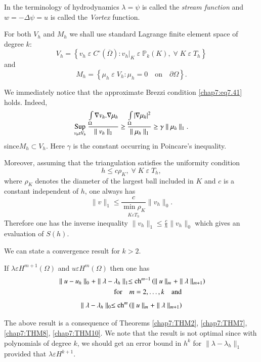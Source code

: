 In the terminology of hydrodynamics $\lambda=\psi$ is called the
\emph{stream function} and $w=-\Delta\psi=u$ is called the
\emph{Vortex} function.

For both $V_h$ and $M_h$ we shall use standard Lagrange finite element
space of degree $k$:
$$
V_h=\left\{v_h\;\varepsilon \;C^\circ(\overline{\Omega}):v_h|_K\;
\varepsilon \;\mathbb{P}_k(K),\;\forall \;K\;\varepsilon \;T_h\right\}
$$
and 
$$
M_h=\left\{\mu_h\;\varepsilon \;V_h:\mu_h=0\quad\text{on}\quad
\partial\Omega\right\}.
$$

We immediately notice that the approximate Brezzi condition
\eqref{chap7:eq7.41} holds. Indeed,
$$
\underset{v_h\varepsilon V_h}{\operatorname{Sup}}\;\frac{\int\limits_\Omega\nabla
v_h.\nabla\mu_h}{\parallel v_h\parallel_1}\geq \frac{\int\limits_\Omega
|\nabla\mu_h|^2}{\parallel\mu_h\parallel_1}\geq\gamma\parallel
\mu_h\parallel_1.
$$
since\pageoriginale $M_h\subset V_h$. Here $\gamma$ is the constant 
occurring in Poincare's inequality.

Moreover, assuming that the triangulation satisfies the uniformity
condition 
$$
h\leq c\rho_K,\;\forall \;K\;\varepsilon \;T_h,
$$
where $\rho_K$ denotes the diameter of the largest ball included in
$K$ and $c$ is a constant independent of $h$, one always has 
$$
\parallel v\parallel_1\leq\underset{K\varepsilon
T_h}{\frac{c}{\min\rho_K}}\parallel v_h\parallel_0.
$$
Therefore one has the inverse inequality $\parallel v_h\parallel_1
\leq \frac{c}{h}\parallel v_h\parallel_0$ which gives an evaluation of
$S(h)$.

We can state a convergence result for $k>2$. 

\begin{THM}\label{chap7:THM11}
If $\lambda\varepsilon H^{m+1}(\Omega)$ and $u\varepsilon H^m(\Omega)$
then one has 
\begin{align*}
&\parallel u-u_h\parallel_0+\parallel\lambda-\lambda_h\parallel_1\leq
\operatorname{ch}^{m-1}\left(\parallel u\parallel_m+\parallel\lambda
\parallel_{m+1}\right)\\
&\qquad\qquad\qquad\qquad\text{for}\quad m=2,\ldots,k\quad\text{and}
\end{align*}
$$
\parallel\lambda-\lambda_h\parallel_0\leq\operatorname{ch}^m\left(\parallel
u\parallel_m +\parallel\lambda\parallel_{m+1}\right)
$$
\end{THM}

The above result is a consequence of Theorems \ref{chap7:THM2},
\ref{chap7:THM7}, \ref{chap7:THM8}, \ref{chap7:THM10}. We note that
the result is not optimal since with polynomials of degree $k$, we
should get an error bound in $h^k$ for $\parallel\lambda-\lambda_h
\parallel_1$ provided that $\lambda\varepsilon H^{k+1}$. 

